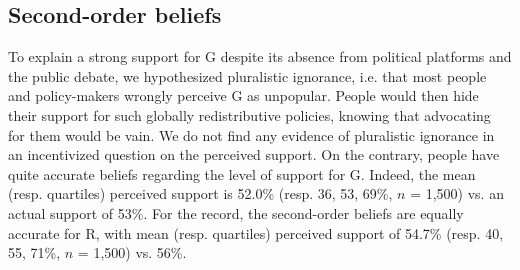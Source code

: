 \documentclass{nature}
\makeatletter
\renewenvironment*{figure}{\@float{figure}}{\end@float}
\makeatother
\begin{document}
\begin{figure}
  \caption{Prioritization of policies. Each respondent faces six policies taken at random from the ones below and allocates 100 points among them to signal the strength of their support for each one ($n$ = 3,000).} %
  
  \label{fig:points}
\end{figure}


\subsection{Second-order beliefs}
To explain a strong support for G despite its absence from political platforms and the public debate, we hypothesized pluralistic ignorance, i.e. that most people and policy-makers wrongly perceive G as unpopular. People would then hide their support for such globally redistributive policies, knowing that advocating for them would be vain. We do not find any evidence of pluralistic ignorance in an incentivized question on the perceived support. On the contrary, people have quite accurate beliefs regarding the level of support for G. Indeed, the mean (resp. quartiles) perceived support is 52.0\% (resp. 36, 53, 69\%, $n$ = 1,500) vs. an actual support of 53\%. For the record, the second-order beliefs are equally accurate for R, with mean (resp. quartiles) perceived support of 54.7\% (resp. 40, 55, 71\%, $n$ = 1,500) vs. 56\%.
\end{document}
